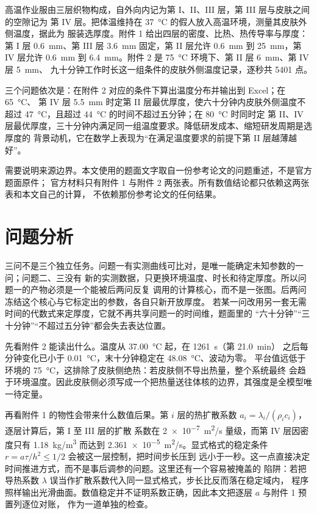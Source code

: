 \documentclass[withoutpreface,bwprint]{cumcmthesis}
\begin{document}
高温作业服由三层织物构成，自外向内记为第 I、II、III 层，第 III 层与皮肤之间的空隙记为
第 IV 层。把体温维持在 \SI{37}{\celsius} 的假人放入高温环境，测量其皮肤外侧温度，据此为
服装选厚度。附件 1 给出四层的密度、比热、热传导率与厚度：第 I 层 \SI{0.6}{mm}、第 III 层
\SI{3.6}{mm} 固定，第 II 层允许 \SI{0.6}{mm} 到 \SI{25}{mm}，第 IV 层允许 \SI{0.6}{mm} 到
\SI{6.4}{mm}。附件 2 是 \SI{75}{\celsius} 环境下、第 II 层 \SI{6}{mm}、第 IV 层 \SI{5}{mm}、
九十分钟工作时长这一组条件的皮肤外侧温度记录，逐秒共 5401 点。

三个问题依次是：在附件 2 对应的条件下算出温度分布并输出到 Excel；在 \SI{65}{\celsius}、
第 IV 层 \SI{5.5}{mm} 时定第 II 层最优厚度，使六十分钟内皮肤外侧温度不超过
\SI{47}{\celsius}，且超过 \SI{44}{\celsius} 的时间不超过五分钟；在 \SI{80}{\celsius} 时同时定
第 II、IV 层最优厚度，三十分钟内满足同一组温度要求。降低研发成本、缩短研发周期是选厚度的
背景动机，它在数学上表现为“在满足温度要求的前提下第 II 层越薄越好”。

需要说明来源边界。本文使用的题面文字取自一份参考论文的问题重述，不是官方题面原件；
官方材料只有附件 1 与附件 2 两张表。所有数值结论都只依赖这两张表和本文自己的计算，
不依赖那份参考论文的任何结果。

\section{问题分析}

三问不是三个独立任务。问题一有实测曲线可比对，是唯一能确定未知参数的一问；问题二、三没有
新的实测数据，只更换环境温度、时长和待定厚度。所以问题一的产物必须是一个能被后两问反复
调用的计算核心，而不是一张图。后两问冻结这个核心与它标定出的参数，各自只新开放厚度。
若某一问改用另一套无需时间的代数式来定厚度，它就不再共享问题一的时间维，题面里的
“六十分钟”“三十分钟”“不超过五分钟”都会失去表达位置。

先看附件 2 能读出什么。温度从 \SI{37.00}{\celsius} 起，在 \SI{1261}{s}（第 \SI{21.0}{min}）
之后每分钟变化已小于 \SI{0.01}{\celsius}，末十分钟稳定在 \SI{48.08}{\celsius}、波动为零。
平台值远低于环境的 \SI{75}{\celsius}，这排除了皮肤侧绝热：若皮肤侧不导出热量，整个系统最终
会趋于环境温度。因此皮肤侧必须写成一个把热量送往体核的边界，其强度是全模型唯一待定量。

再看附件 1 的物性会带来什么数值后果。第 $i$ 层的热扩散系数
$a_i=\lambda_i/(\rho_i c_i)$，逐层计算后，第 I 至 III 层的扩散
系数在 \SI{2e-7}{m^2/s} 量级，而第 IV 层因密度只有 \SI{1.18}{kg/m^3} 而达到
\SI{2.361e-5}{m^2/s}。显式格式的稳定条件 $r=a\tau/h^2\le 1/2$ 会被这一层控制，把时间步长压到
远小于一秒。这一点直接决定时间推进方式，而不是事后调参的问题。这里还有一个容易被掩盖的
陷阱：若把导热系数 $\lambda$ 误当作扩散系数代入同一显式格式，步长比反而落在稳定域内，
程序照样输出光滑曲面。数值稳定并不证明系数正确，因此本文把逐层 $a$ 与附件 1 预置列逐位对账，
作为一道单独的检查。
\end{document}
